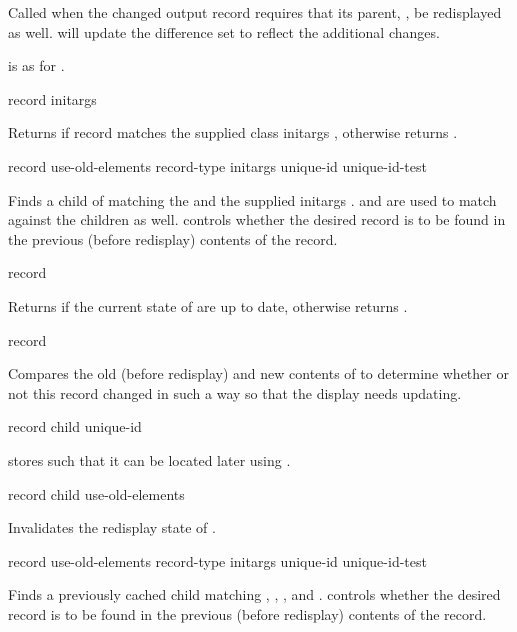 Called when the changed  output record requires that its parent,
, be redisplayed as well.  
will update the difference set to reflect the additional changes.

 is as for .


 {record \rest initargs}

Returns  if record matches the supplied class initargs
, otherwise returns .

 {record use-old-elements record-type
                                        \rest initargs
                                        \key unique-id unique-id-test}

Finds a child of  matching the  and the supplied
initargs .   and  are used to
match against the children as well.   controls whether the
desired record is to be found in the previous (before redisplay) contents of the
record.

 {record}

Returns  if the current state of  are up to date,
otherwise returns .

 {record}

Compares the old (before redisplay) and new contents of  to
determine whether or not this record changed in such a way so that the display
needs updating.

 {record child unique-id}

 stores  such that it can be located later using
.

 {record child use-old-elements}

Invalidates the redisplay state of .

 {record use-old-elements record-type
                                         \rest initargs
                                         \key unique-id unique-id-test \allow}

Finds a previously cached child matching , ,
, and .   controls
whether the desired record is to be found in the previous (before redisplay)
contents of the record.


